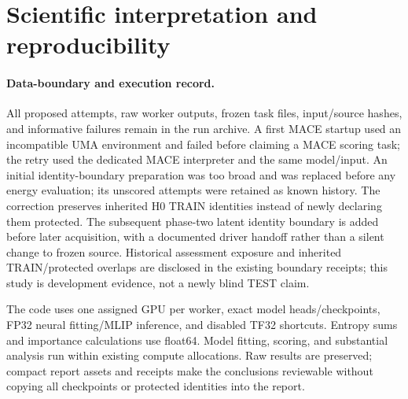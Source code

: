\documentclass[11pt]{article}
\begin{document}


\section{Scientific interpretation and reproducibility}


\paragraph{Data-boundary and execution record.}
All proposed attempts, raw worker outputs, frozen task files, input/source
hashes, and informative failures remain in the run archive. A first MACE
startup used an incompatible UMA environment and failed before claiming a
MACE scoring task; the retry used the dedicated MACE interpreter and the same
model/input. An initial identity-boundary preparation was too broad and was
replaced before any energy evaluation; its unscored attempts were retained
as known history. The correction preserves inherited H0 TRAIN identities
instead of newly declaring them protected. The subsequent phase-two latent
identity boundary is added before later acquisition, with a documented
driver handoff rather than a silent change to frozen source. Historical
assessment exposure and inherited TRAIN/protected overlaps are disclosed
in the existing boundary receipts; this study is development evidence, not
a newly blind TEST claim.

The code uses one assigned GPU per worker, exact model heads/checkpoints,
FP32 neural fitting/MLIP inference, and disabled TF32 shortcuts. Entropy sums
and importance calculations use float64. Model fitting, scoring, and
substantial analysis run within existing compute allocations. Raw results are
preserved; compact report assets and receipts make the conclusions reviewable
without copying all checkpoints or protected identities into the report.



\end{document}

